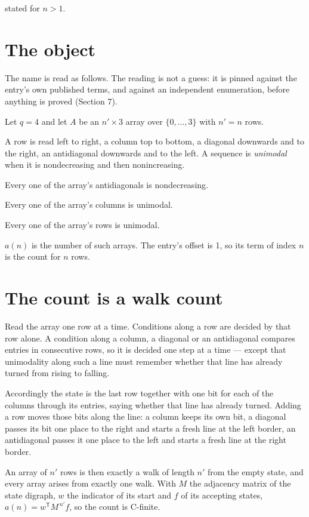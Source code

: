 \documentclass[11pt]{article}
\theoremstyle{definition}
\begin{document}
stated for $n > 1$.

\section{The object}

The name is read as follows. The reading is not a guess: it is pinned against the entry's own published terms, and against an independent enumeration, before anything is proved (Section 7).

Let $q = 4$ and let $A$ be an $n' \times 3$ array over $\{0,\dots,3\}$ with $n' = n$ rows.

A row is read left to right, a column top to bottom, a diagonal downwards and to the right, an antidiagonal downwards and to the left. A sequence is {\itshape unimodal} when it is nondecreasing and then nonincreasing.

Every one of the array's antidiagonals is nondecreasing.

Every one of the array's columns is unimodal.

Every one of the array's rows is unimodal.

$a(n)$ is the number of such arrays. The entry's offset is 1, so its term of index $n$ is the count for $n$ rows.

\section{The count is a walk count}

Read the array one row at a time. Conditions along a row are decided by that row alone. A condition along a column, a diagonal or an antidiagonal compares entries in consecutive rows, so it is decided one step at a time --- except that unimodality along such a line must remember whether that line has already turned from rising to falling.

Accordingly the state is the last row together with one bit for each of the columns through its entries, saying whether that line has already turned. Adding a row moves those bits along the line: a column keeps its own bit, a diagonal passes its bit one place to the right and starts a fresh line at the left border, an antidiagonal passes it one place to the left and starts a fresh line at the right border.

An array of $n'$ rows is then exactly a walk of length $n'$ from the empty state, and every array arises from exactly one walk. With $M$ the adjacency matrix of the state digraph, $w$ the indicator of its start and $f$ of its accepting states, $a(n) = w^{\mathsf T}M^{\,n'}f$, so the count is C-finite.
\end{document}
